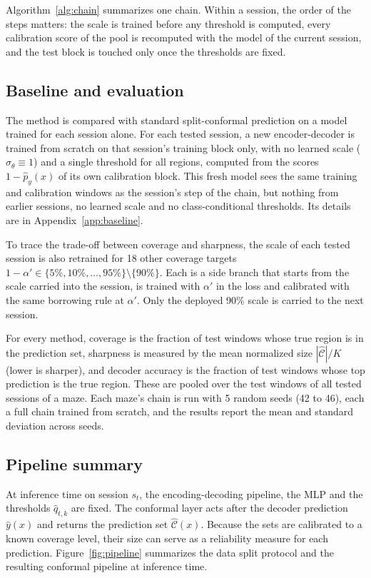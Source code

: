 \documentclass{article}
\begin{document}
Algorithm~\ref{alg:chain} summarizes one chain. Within a session, the order of the steps matters: the scale is trained before any threshold is computed, every calibration score of the pool is recomputed with the model of the current session, and the test block is touched only once the thresholds are fixed.

\FloatBarrier
\subsection{Baseline and evaluation}
\label{sec:baselines}
The method is compared with standard split-conformal prediction on a model trained for each session alone. For each tested session, a new encoder-decoder is trained from scratch on that session's training block only, with no learned scale ($\sigma_\theta\equiv1$) and a single threshold for all regions, computed from the scores $1-\hat p_{y}(x)$ of its own calibration block. This fresh model sees the same training and calibration windows as the session's step of the chain, but nothing from earlier sessions, no learned scale and no class-conditional thresholds. Its details are in Appendix~\ref{app:baseline}.

To trace the trade-off between coverage and sharpness, the scale of each tested session is also retrained for 18 other coverage targets $1-\alpha'\in\{5\%,10\%,\ldots,95\%\}\setminus\{90\%\}$. Each is a side branch that starts from the scale carried into the session, is trained with $\alpha'$ in the loss and calibrated with the same borrowing rule at $\alpha'$. Only the deployed 90\% scale is carried to the next session.

For every method, coverage is the fraction of test windows whose true region is in the prediction set, sharpness is measured by the mean normalized size $|\widehat{\mathcal{C}}|/K$ (lower is sharper), and decoder accuracy is the fraction of test windows whose top prediction is the true region. These are pooled over the test windows of all tested sessions of a maze. Each maze's chain is run with 5 random seeds (42 to 46), each a full chain trained from scratch, and the results report the mean and standard deviation across seeds.

\subsection{Pipeline summary}
At inference time on session $s_t$, the encoding-decoding pipeline, the MLP and the thresholds $\hat q_{t,k}$ are fixed. The conformal layer acts after the decoder prediction $\hat y(x)$ and returns the prediction set $\widehat{\mathcal{C}}(x)$. Because the sets are calibrated to a known coverage level, their size can serve as a reliability measure for each prediction. Figure~\ref{fig:pipeline} summarizes the data split protocol and the resulting conformal pipeline at inference time.
\end{document}
